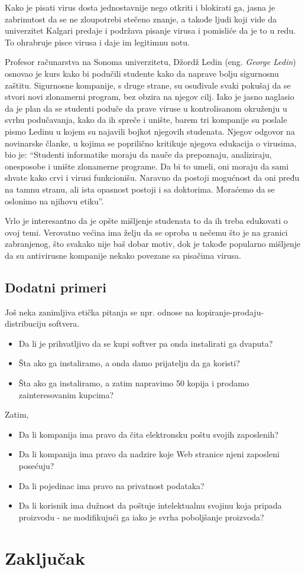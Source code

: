 \documentclass[a4paper]{article}
\begin{document}
Kako je pisati virus dosta jednostavnije nego otkriti i blokirati ga, jasna je zabrinutost da se ne zloupotrebi stečeno znanje, a takođe ljudi koji vide da univerzitet Kalgari predaje i podržava pisanje virusa i pomisliće da je to u redu. 
To ohrabruje pisce virusa i daje im legitimnu notu.

Profesor računarstva na Sonoma univerzitetu, Džordž Ledin (eng. \textit{George Ledin}) osnovao je kurs kako bi podučili studente kako da naprave bolju sigurnosnu zaštitu. Sigurnosne kompanije, s druge strane, su osuđivale
svaki pokušaj da se stvori novi zlonamerni program, bez obzira na njegov cilj. Iako je jasno naglasio da je plan da se studenti poduče da prave viruse u kontrolisanom okruženju u svrhu podučavanja, kako da
ih spreče i unište, barem tri kompanije su poslale pismo Ledinu u kojem su najavili bojkot njegovih studenata.
Njegov odgovor na novinarske članke, u kojima se poprilično kritikuje njegova edukacija o virusima, bio je: ``Studenti informatike moraju da nauče da prepoznaju, analiziraju, onesposobe i unište zlonamerne programe.
Da bi to umeli, oni moraju da sami shvate kako crvi i virusi funkcionišu. Naravno da postoji mogućnost da oni pređu na tamnu stranu, ali ista opasnost postoji i sa doktorima. Moraćemo da se oslonimo na njihovu etiku''.


Vrlo je interesantno da je opšte mišljenje studenata to da ih treba edukovati o ovoj temi. Verovatno većina ima želju da se oproba u nečemu što je na granici zabranjenog, što svakako nije baš dobar motiv,
dok je takođe popularno mišljenje da su antivirusne kompanije nekako povezane sa pisačima virusa.

\subsection{Dodatni primeri}
Još neka zanimljiva etička pitanja se npr. odnose na kopiranje-prodaju-distribuciju softvera.
\begin{itemize}
\item Da li je prihvatljivo da se kupi softver pa onda instalirati ga dvaputa?
\item Šta ako ga instaliramo, a onda damo prijatelju da ga koristi?
\item Šta ako ga instaliramo, a zatim napravimo 50 kopija i prodamo zainteresovanim kupcima?
\end{itemize}
Zatim,
\begin{itemize} 
\item Da li kompanija ima pravo da čita elektronsku poštu svojih zaposlenih?
\item Da li kompanija ima pravo da nadzire koje Web stranice njeni zaposleni posećuju?
\item Da li pojedinac ima pravo na privatnost podataka?
\item Da li korisnik ima dužnost da poštuje intelektualnu svojinu koja pripada proizvodu - ne modifikujući ga iako je svrha poboljšanje proizvoda?
\end{itemize}

\section{Zaključak}
\label{sec:zakljucak}




\appendix
 


\appendix
\end{document}
